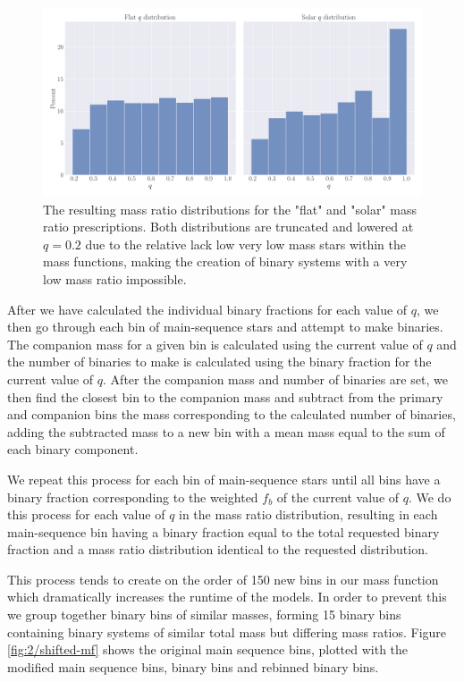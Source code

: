 \begin{figure}
    \centering
    \includegraphics[width=\textwidth]{figures/q-dists.png}
    \caption{The resulting mass ratio distributions for the "flat" and "solar" mass ratio prescriptions.
        Both distributions are truncated and lowered at $q=0.2$ due to the relative lack low very low mass
        stars within the mass functions, making the creation of binary systems with a very low mass ratio
        impossible.}
    \label{fig:2/q-dists}
\end{figure}


After we have calculated the individual binary fractions for each value of $q$, we then go through
each bin of main-sequence stars and attempt to make binaries. The companion mass for a given bin is
calculated using the current value of $q$ and the number of binaries to make is calculated using the
binary fraction for the current value of $q$. After the companion mass and number of binaries are
set, we then find the closest bin to the companion mass and subtract from the primary and companion
bins the mass corresponding to the calculated number of binaries, adding the subtracted mass to a
new bin with a mean mass equal to the sum of each binary component.


We repeat this process for each bin of main-sequence stars until all bins have a binary fraction
corresponding to the weighted $f_b$ of the current value of $q$. We do this process for each value
of $q$ in the mass ratio distribution, resulting in each main-sequence bin having a binary fraction
equal to the total requested binary fraction and a mass ratio distribution identical to the
requested distribution.


This process tends to create on the order of 150 new bins in our mass function which dramatically
increases the runtime of the  models. In order to prevent this we group together binary
bins of similar masses, forming 15 binary bins containing binary systems of similar total mass but
differing mass ratios. Figure \ref{fig:2/shifted-mf} shows the original main sequence bins, plotted
with the modified main sequence bins, binary bins and rebinned binary bins.


